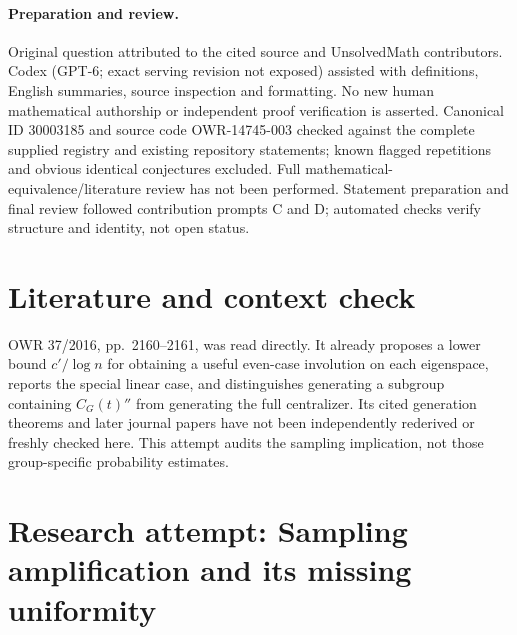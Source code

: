 \documentclass[11pt]{article}
\begin{document}
\paragraph{Preparation and review.}
Original question attributed to the cited source and UnsolvedMath contributors. Codex (GPT-6; exact serving revision not exposed) assisted with definitions, English summaries, source inspection and formatting. No new human mathematical authorship or independent proof verification is asserted. Canonical ID 30003185 and source code OWR-14745-003 checked against the complete supplied registry and existing repository statements; known flagged repetitions and obvious identical conjectures excluded. Full mathematical-equivalence/literature review has not been performed. Statement preparation and final review followed contribution prompts C and D; automated checks verify structure and identity, not open status.
\label{end:30003185}

\section{Literature and context check}
OWR 37/2016, pp.~2160--2161, was read directly. It already proposes a lower bound $c'/\log n$ for obtaining a useful even-case involution on each eigenspace, reports the special linear case, and distinguishes generating a subgroup containing $C_G(t)''$ from generating the full centralizer. Its cited generation theorems and later journal papers have not been independently rederived or freshly checked here. This attempt audits the sampling implication, not those group-specific probability estimates.
\section{Research attempt: Sampling amplification and its missing uniformity}
\end{document}
